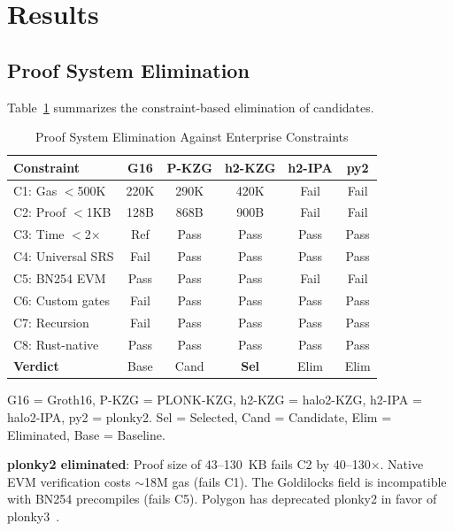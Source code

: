 
\section{Results}
\label{sec:results}

\subsection{Proof System Elimination}

Table~\ref{tab:elimination} summarizes the constraint-based
elimination of candidates.

\begin{table}[htbp]
\caption{Proof System Elimination Against Enterprise Constraints}
\label{tab:elimination}
\centering
\begin{tabular}{@{}lccccc@{}}
\toprule
\textbf{Constraint} & \textbf{G16} & \textbf{P-KZG} & \textbf{h2-KZG} & \textbf{h2-IPA} & \textbf{py2} \\
\midrule
C1: Gas $<$500K      & 220K  & 290K  & 420K  & Fail  & Fail \\
C2: Proof $<$1KB     & 128B  & 868B  & 900B  & Fail  & Fail \\
C3: Time $<$2$\times$& Ref   & Pass  & Pass  & Pass  & Pass \\
C4: Universal SRS    & Fail  & Pass  & Pass  & Pass  & Pass \\
C5: BN254 EVM        & Pass  & Pass  & Pass  & Fail  & Fail \\
C6: Custom gates     & Fail  & Pass  & Pass  & Pass  & Pass \\
C7: Recursion        & Fail  & Pass  & Pass  & Pass  & Pass \\
C8: Rust-native      & Pass  & Pass  & Pass  & Pass  & Pass \\
\midrule
\textbf{Verdict}     & Base  & Cand  & \textbf{Sel}   & Elim  & Elim \\
\bottomrule
\end{tabular}
\begin{flushleft}
\footnotesize G16 = Groth16, P-KZG = PLONK-KZG, h2-KZG = halo2-KZG,
h2-IPA = halo2-IPA, py2 = plonky2. Sel = Selected, Cand = Candidate,
Elim = Eliminated, Base = Baseline.
\end{flushleft}
\end{table}

\textbf{plonky2 eliminated}: Proof size of 43--130~KB fails C2 by
40--130$\times$. Native EVM verification costs $\sim$18M gas (fails
C1). The Goldilocks field is incompatible with BN254 precompiles
(fails C5). Polygon has deprecated plonky2 in favor of
plonky3~\cite{plonky2}.

